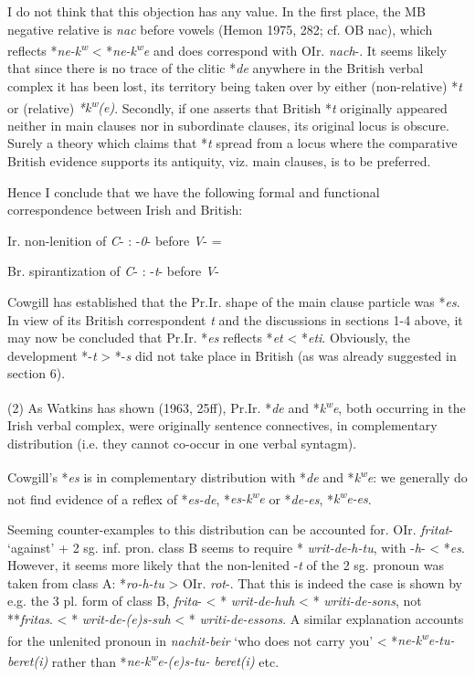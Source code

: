 I do not think that this objection has any value. In the first place, the
MB negative relative is \textit{nac} before vowels (Hemon 1975, 282; cf. OB
nac), which reflects *\textit{ne-k\textsuperscript{w}} < *\textit{ne-k\textsuperscript{w}e} and does correspond with OIr.
\textit{nach}-. It seems likely that since there is no trace of the clitic *\textit{de}
anywhere in the British verbal complex it has been lost, its territory being
taken over by either (non-relative) *\textit{t} or (relative) \textit{*k\textsuperscript{w}(e)}. Secondly, if
one asserts that British *\textit{t} originally appeared neither in main clauses nor
in subordinate clauses, its original locus is obscure. Surely a theory which
claims that *\textit{t} spread from a locus where the comparative British evidence
supports its antiquity, viz. main clauses, is to be preferred.

Hence I conclude that we have the following formal and functional
correspondence between Irish and British:

Ir. non-lenition of \textit{C}- : -\textit{0}- before \textit{V}- =

Br. spirantization of \textit{C}- : -\textit{t}- before \textit{V}-

Cowgill has established that the Pr.Ir. shape of the main clause particle
was *\textit{es}. In view of its British correspondent \textit{t} and the discussions in
sections 1-4 above, it may now be concluded that Pr.Ir. *\textit{es} reflects
*\textit{et} < *\textit{eti}. Obviously, the development *-\textit{t} > *-\textit{s} did not take place in
British (as was already suggested in section 6).

(2) As Watkins has shown (1963, 25ff), Pr.Ir. *\textit{de} and *\textit{k\textsuperscript{w}e}, both
occurring in the Irish verbal complex, were originally sentence connectives,
in complementary distribution (i.e. they cannot co-occur in one
verbal syntagm).

Cowgill's *\textit{es} is in complementary distribution with *\textit{de} and *\textit{k\textsuperscript{w}e}: we
generally do not find evidence of a reflex of *\textit{es-de}, *\textit{es-k\textsuperscript{w}e} or *\textit{de-es},
*\textit{k\textsuperscript{w}e-es}.

Seeming counter-examples to this distribution can be accounted for.
OIr. \textit{fritat}- `against' + 2 sg. inf. pron. class B seems to require * \textit{writ-de-h-tu},
with -\textit{h}- < *\textit{es}. However, it seems more likely that the non-lenited -\textit{t} of
the 2 sg. pronoun was taken from class A: *\textit{ro-h-tu} > OIr. \textit{rot}-. That this
is indeed the case is shown by e.g. the 3 pl. form of class B, \textit{frita}- < * \textit{writ-de-huh} < * \textit{writi-de-sons}, not **\textit{fritas}. < * \textit{writ-de-(e)s-suh} < * \textit{writi-de-essons}.
A similar explanation accounts for the unlenited pronoun in
\textit{nachit-beir} `who does not carry you' < *\textit{ne-k\textsuperscript{w}e-tu-beret(i) }rather than
*\textit{ne-k\textsuperscript{w}e-(e)s-tu- beret(i) }etc.

